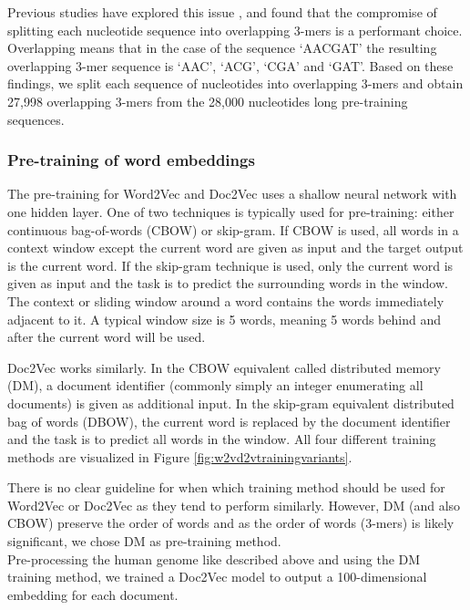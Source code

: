 Previous studies have explored this issue \cite{kmerlength1} \cite{kmerlength2}, and found that the compromise of splitting each nucleotide sequence into overlapping 3-mers is a performant choice. Overlapping means that in the case of the sequence `AACGAT' the resulting overlapping 3-mer sequence is `AAC', `ACG', `CGA' and `GAT'. Based on these findings, we split each sequence of nucleotides into overlapping 3-mers and obtain 27,998 overlapping 3-mers from the 28,000 nucleotides long pre-training sequences. 

\subsubsection{Pre-training of word embeddings}
The pre-training for Word2Vec and Doc2Vec uses a shallow neural network with one hidden layer. %
One of two techniques is typically used for pre-training: either continuous bag-of-words (CBOW) or skip-gram. If CBOW is used, all words in a context window except the current word are given as input and the target output is the current word.  %
If the skip-gram technique is used, only the current word is given as input and the task is to predict the surrounding words in the window. The context or sliding window around a word contains the words immediately adjacent to it. A typical window size is 5 words, meaning 5 words behind and after the current word will be used. 

Doc2Vec works similarly. In the CBOW equivalent called distributed memory (DM), a document identifier (commonly simply an integer enumerating all documents) is given as additional input. In the skip-gram equivalent distributed bag of words (DBOW), the current word is replaced by the document identifier and the task is to predict all words in the window. All four different training methods are visualized in Figure \ref{fig:w2vd2vtrainingvariants}.

There is no clear guideline for when which training method should be used for Word2Vec or Doc2Vec as they tend to perform similarly. However, DM (and also CBOW) preserve the order of words and as the order of words (3-mers) is likely significant, we chose DM as pre-training method.\\
Pre-processing the human genome like described above and using the DM training method, we trained a Doc2Vec model to output a 100-dimensional embedding for each document.

